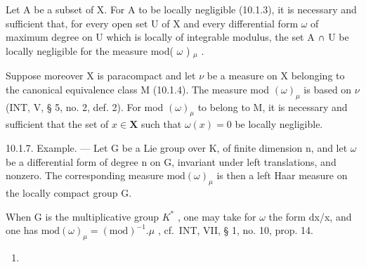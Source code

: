Let A be a subset of X. For A to be locally negligible (10.1.3), it is necessary and sufficient that, for every open set U of X and every differential form \(\omega\) of maximum degree on U which is locally of integrable modulus, the set A ∩ U be locally negligible for the measure mod( \(\omega\) ) \(_{\mu}\) .

Suppose moreover X is paracompact and let \(\nu\) be a measure on X belonging to the canonical equivalence class M (10.1.4). The measure mod \((\omega)_{\mu}\) is based on \(\nu\) (INT, V, § 5, no. 2, def. 2). For mod \((\omega)_{\mu}\) to belong to M, it is necessary and sufficient that the set of \(x \in \mathbf{X}\) such that \(\omega(x) = 0\) be locally negligible.

10.1.7. Example. --- Let G be a Lie group over K, of finite dimension n, and let \(\omega\) be a differential form of degree n on G, invariant under left translations, and nonzero. The corresponding measure \(\text{mod}(\omega)_{\mu}\) is then a left Haar measure on the locally compact group G.

When G is the multiplicative group \(K^{*}\) , one may take for \(\omega\) the form dx/x, and one has \(\text{mod}(\omega)_{\mu} = (\text{mod})^{-1}.\mu\) , cf.~INT, VII, § 1, no. 10, prop. 14.
\begin{enumerate}
\def\labelenumi{(\arabic{enumi})}
\setcounter{enumi}{6}
\tightlist
\item
\end{enumerate}
\relax{}
